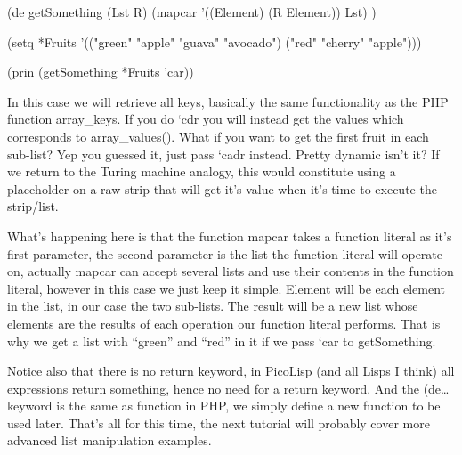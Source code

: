 \begin{wideverbatim}
(de getSomething (Lst R)
    (mapcar '((Element) (R Element)) Lst) )

(setq *Fruits 
      '(("green" "apple" "guava" "avocado") 
        ("red" "cherry" "apple")))

(prin (getSomething *Fruits 'car))
\end{wideverbatim}

In this case we will retrieve all keys, basically the same functionality
as the PHP function array\_keys. If you do ‘cdr you will instead get the
values which corresponds to array\_values(). What if you want to get the
first fruit in each sub-list? Yep you guessed it, just pass ‘cadr
instead. Pretty dynamic isn't it? If we return to the Turing machine
analogy, this would constitute using a placeholder on a raw strip that
will get it's value when it's time to execute the strip/list.

What's happening here is that the function mapcar takes a function
literal as it's first parameter, the second parameter is the list the
function literal will operate on, actually mapcar can accept several
lists and use their contents in the function literal, however in this
case we just keep it simple. Element will be each element in the list,
in our case the two sub-lists. The result will be a new list whose
elements are the results of each operation our function literal
performs. That is why we get a list with ``green'' and ``red'' in it if we
pass ‘car to getSomething.

Notice also that there is no return keyword, in PicoLisp (and all Lisps
I think) all expressions return something, hence no need for a return
keyword. And the (de… keyword is the same as function in PHP, we simply
define a new function to be used later. That's all for this time, the
next tutorial will probably cover more advanced list manipulation
examples.

